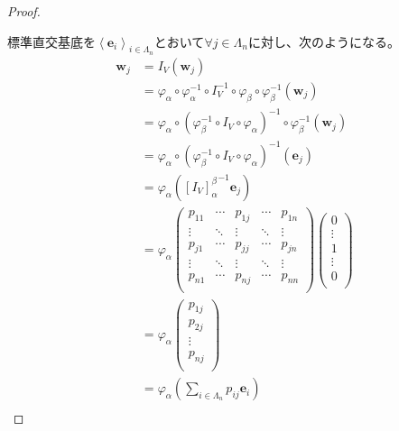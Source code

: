 \documentclass[dvipdfmx]{jsarticle}
\begin{document}
\begin{proof}
\begin{center}
\end{center}
標準直交基底を$\left\langle \mathbf{e}_{i} \right\rangle_{i \in \varLambda_{n}}$とおいて$\forall j \in \varLambda_{n}$に対し、次のようになる。
\begin{align*}
\mathbf{w}_{j} &= I_{V}\left( \mathbf{w}_{j} \right)\\
&= \varphi_{\alpha} \circ \varphi_{\alpha}^{- 1} \circ I_{V}^{- 1} \circ \varphi_{\beta} \circ \varphi_{\beta}^{- 1}\left( \mathbf{w}_{j} \right)\\
&= \varphi_{\alpha} \circ \left( \varphi_{\beta}^{- 1} \circ I_{V} \circ \varphi_{\alpha} \right)^{- 1} \circ \varphi_{\beta}^{- 1}\left( \mathbf{w}_{j} \right)\\
&= \varphi_{\alpha} \circ \left( \varphi_{\beta}^{- 1} \circ I_{V} \circ \varphi_{\alpha} \right)^{- 1}\left( \mathbf{e}_{j} \right)\\
&= \varphi_{\alpha}\left( {\left[ I_{V} \right]^{\beta}_{\alpha}}^{- 1}\mathbf{e}_{j} \right)\\
&= \varphi_{\alpha}\begin{pmatrix}
p_{11} & \cdots & p_{1j} & \cdots & p_{1n} \\
 \vdots & \ddots & \vdots & \ddots & \vdots \\
p_{j1} & \cdots & p_{jj} & \cdots & p_{jn} \\
 \vdots & \ddots & \vdots & \ddots & \vdots \\
p_{n1} & \cdots & p_{nj} & \cdots & p_{nn} \\
\end{pmatrix}\begin{pmatrix}
0 \\
 \vdots \\
1 \\
 \vdots \\
0 \\
\end{pmatrix}\\
&= \varphi_{\alpha}\begin{pmatrix}
p_{1j} \\
p_{2j} \\
 \vdots \\
p_{nj} \\
\end{pmatrix}\\
&= \varphi_{\alpha}\left( \sum_{i \in \varLambda_{n}} {p_{ij}\mathbf{e}_{i}} \right)\\

\end{align*}
\end{proof}
\end{document}
